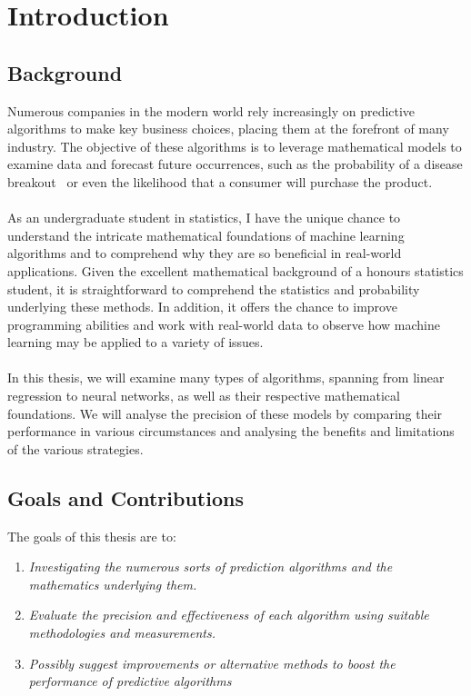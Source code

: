 \documentclass{article}[12pt]
\theoremstyle{definition}
\begin{document}
\newpage

\section{Introduction}

\bigskip

\subsection{Background}

\bigskip

Numerous companies in the modern world rely increasingly on predictive algorithms to make key business choices, placing them at the forefront of many industry. The objective of these algorithms is to leverage mathematical models to examine data and forecast future occurrences, such as the probability of a disease breakout  or even the likelihood that a consumer will purchase the product.
\\
\\
As an undergraduate student in statistics, I have the unique chance to understand the intricate mathematical foundations of machine learning algorithms and to comprehend why they are so beneficial in real-world applications. Given the excellent mathematical background of a honours statistics student, it is straightforward to comprehend the statistics and probability underlying these methods. In addition, it offers the chance to improve programming abilities and work with real-world data to observe how machine learning may be applied to a variety of issues.
\\
\\
In this thesis, we will examine many types of algorithms, spanning from linear regression to neural networks, as well as their respective mathematical foundations. We will analyse the precision of these models by comparing their performance in various circumstances and analysing the benefits and limitations of the various strategies.

\bigskip

\subsection{Goals and Contributions}

\bigskip

The goals of this thesis are to:
\begin{enumerate}
    \item \emph{Investigating the numerous sorts of prediction algorithms and the mathematics underlying them.}
    \item \emph{Evaluate the precision and effectiveness of each algorithm using suitable methodologies and \mbox{measurements}.}
    \item \emph{Possibly suggest improvements or alternative methods to boost the performance of predictive algorithms}
\end{enumerate}
\end{document}

